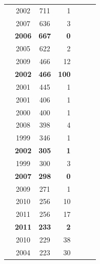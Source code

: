 \documentclass[smallextended]{svjour3}
\newcommand{\cmark}{\ding{51}}%
\newcommand{\xmark}{\ding{55}}%
\begin{document}
\begin{table}
\begin{tabular}{r|@{~}c|@{~}c|@{~}r|@{~}c|@{~}c|@{~}c}
        \cite{1191795} & 2002 &	711	& 1 & \cmark & \cmark & \xmark \\
        \cite{Zimmermann:2007:PDE:1268984.1269057} & 2007 &	636	& 3 & \cmark & \cmark & \xmark \\
       \rowcolor{blue!10}  \textbf{\cite{boehm2006view}} & \textbf{2006} &	\textbf{667} & \textbf{0} & \xmark & \cmark & \xmark \\
        \cite{1435354} & 2005 &	622	& 2 & \cmark & \cmark & \xmark \\
        \cite{Zimmermann:2009:CDP:1595696.1595713} & 2009 &	466	& 12 & \cmark & \cmark & \xmark \\
       \rowcolor{blue!10}  \textbf{\cite{KrishnamurthyS}} & \textbf{2002} &	\textbf{466} & \textbf{100} & \xmark & \cmark & \xmark \\
        \cite{935855} & 2001 &	445	& 1 & \cmark & \xmark & \xmark \\
        \cite{ELEMAM200163} & 2001 &	406	& 1 & \cmark & \xmark & \xmark \\
        \cite{Cartwright} & 2000 &	400 &	1 & \cmark & \xmark & \xmark \\
        \cite{ELISH2008649} & 2008 &	398 &	4 & \cmark & \xmark & \xmark \\
        \cite{841025} & 1999 & 346 &	1 & \cmark & \xmark & \xmark \\
        \rowcolor{blue!10} \textbf{\cite{koch2002effort}} & \textbf{2002} &	\textbf{305} & \textbf{1} & \xmark & \cmark & \xmark \\
        \cite{809745} & 1999 & 300 &	3 & \cmark & \xmark & \xmark \\
        \rowcolor{blue!10} \textbf{\cite{4221622}} & \textbf{2007} &	\textbf{298} & \textbf{0} & \xmark & \cmark & \xmark \\
        \cite{5560680} & 2009 &	271 &	1 & \cmark & \cmark & \xmark \\
        \cite{Menzies2010} & 2010 &	256 &	10 & \cmark & \xmark & \xmark \\
        \cite{5611551} & 2011 &	256	& 17 & \cmark & \cmark & \xmark \\
        \rowcolor{blue!10} \textbf{\cite{Bird:2011:DTM:2025113.2025119}} & \textbf{2011} &	\textbf{233} &	\textbf{2} & \xmark & \cmark & \cmark \\
        \cite{Jureczko:2010:TIS:1868328.1868342} & 2010 &	229	& 38 & \cmark & \xmark & \xmark \\
        \cite{FENTON200732} & 2004 &	223 &	30 & \xmark & \cmark & \xmark \\

\end{tabular}
\end{table}
\end{document}

